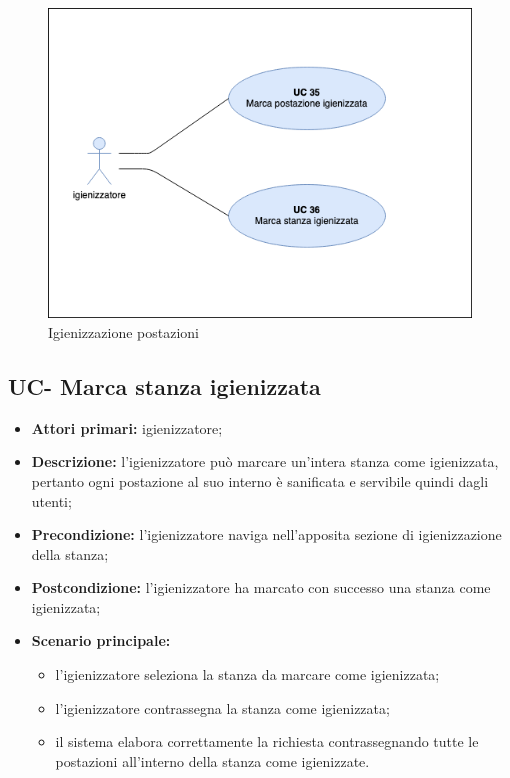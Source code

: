\begin{figure}[H]
  \centering
    \includegraphics[width=\textwidth]{src/CasiDUso/immagini/UC-igienizzazionePostazioni.png}
  \caption{Igienizzazione postazioni}
\end{figure}

\subsection{UC- Marca stanza igienizzata}

\begin{itemize}
\item \textbf{Attori primari:} igienizzatore;
\item \textbf{Descrizione:} l’igienizzatore può marcare un'intera stanza come igienizzata, pertanto ogni postazione al suo interno è sanificata e servibile quindi dagli utenti;
\item \textbf{Precondizione:} l'igienizzatore naviga nell’apposita sezione di igienizzazione della stanza; 
\item \textbf{Postcondizione:} l'igienizzatore ha marcato con successo una stanza come igienizzata;
\item \textbf{Scenario principale:} 
	\begin{itemize}
		\item l'igienizzatore seleziona la stanza da marcare come igienizzata;	
		\item l'igienizzatore contrassegna la stanza come igienizzata;
		\item il sistema elabora correttamente la richiesta contrassegnando tutte le postazioni all'interno della stanza come igienizzate.
		\end{itemize}
\end{itemize}

